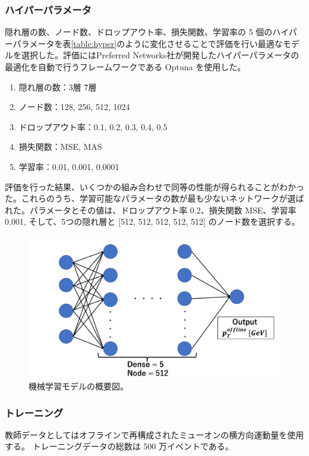 \subsubsection{ハイパーパラメータ}
隠れ層の数、ノード数、ドロップアウト率、損失関数、学習率の 5 個のハイパーパラメータを表\ref{table:hyper}のように変化させることで評価を行い最適なモデルを選択した。評価にはPreferred Networks社が開発したハイパーパラメータの最適化を自動で行うフレームワークである Optuna \cite{article:optuna}を使用した。
\begin{enumerate}\label{table:hyper}
   \item 隠れ層の数：3層 \~ 7層
   \item ノード数：128, 256, 512, 1024
   \item ドロップアウト率：0.1, 0.2, 0.3, 0.4, 0.5
   \item 損失関数：MSE, MAS
   \item 学習率：0.01, 0.001, 0.0001
\end{enumerate}
評価を行った結果、いくつかの組み合わせで同等の性能が得られることがわかった。これらのうち、学習可能なパラメータの数が最も少ないネットワークが選ばれた。パラメータとその値は、ドロップアウト率 0.2、損失関数 MSE、学習率 0.001, そして、5つの隠れ層と [512, 512, 512, 512, 512] のノード数を選択する。

\begin{figure}[tb]
  \centering
  \includegraphics[clip, width=12cm]{fig/4/MLP.pdf}
  \caption{機械学習モデルの概要図。}
  \label{fig:MLP_overview}
\end{figure}


\subsubsection{トレーニング}


教師データとしてはオフラインで再構成されたミューオンの横方向運動量を使用する。
トレーニングデータの総数は 500 万イベントである。

